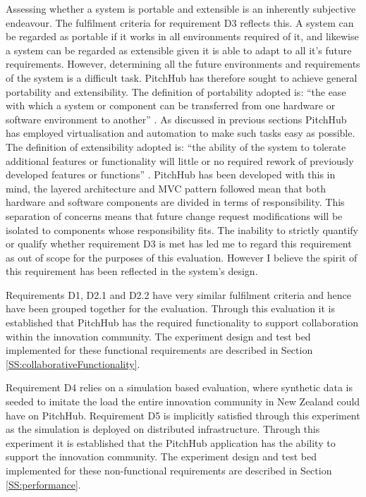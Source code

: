 Assessing whether a system is portable and extensible is an inherently subjective endeavour. The fulfilment criteria for requirement D3 reflects this. A system can be regarded as portable if it works in all environments required of it, and likewise a system can be regarded as extensible given it is able to adapt to all it's future requirements. However, determining all the future environments and requirements of the system is a difficult task. PitchHub has therefore sought to achieve general portability and extensibility. The definition of portability adopted is: ``the ease with which a system or component can be transferred from one hardware or software environment to another'' \cite{mattsson2006software}. As discussed in previous sections PitchHub has employed virtualisation and automation to make such tasks easy as possible. The definition of extensibility adopted is: ``the ability of the system to tolerate additional features or functionality will little or no required rework of previously developed features or functions'' \cite{Extensibility:online}. PitchHub has been developed with this in mind, the layered architecture and MVC pattern followed mean that both hardware and software components are divided in terms of responsibility. This separation of concerns means that future change request modifications will be isolated to components whose responsibility fits. The inability to strictly quantify or qualify whether requirement D3 is met has led me to regard this requirement as out of scope for the purposes of this evaluation. However I believe the spirit of this requirement has been reflected in the system's design.

Requirements D1, D2.1 and D2.2 have very similar fulfilment criteria and hence have been grouped together for the evaluation. Through this evaluation it is established that PitchHub has the required functionality to support collaboration within the innovation community. The experiment design and test bed implemented for these functional requirements are described in Section \ref{SS:collaborativeFunctionality}.

Requirement D4 relies on a simulation based evaluation, where synthetic data is seeded to imitate the load the entire innovation community in New Zealand could have on PitchHub. Requirement D5 is implicitly satisfied through this experiment as the simulation is deployed on distributed infrastructure. Through this experiment it is established that the PitchHub application has the ability to support the innovation community. The experiment design and test bed implemented for these non-functional requirements are described in Section \ref{SS:performance}.


